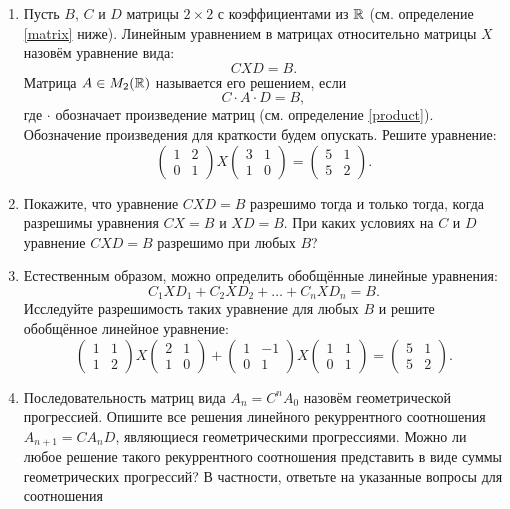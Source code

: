 
\begin{enumerate}
\item Пусть $B$, $C$ и $D$ матрицы $2\times 2$ с коэффициентами из $\mathbb{R}$ (см. определение \ref{matrix} ниже). Линейным уравнением в матрицах относительно матрицы $X$ назовём уравнение вида: 
$$CXD=B.$$
Матрица $A\in M_2(\mathbb{R})$ называется его решением, если 
$$C\cdot A\cdot D=B,$$
где $\cdot$ обозначает произведение матриц (см. определение \ref{product}). Обозначение произведения для краткости будем опускать.
Решите уравнение:
$$\left(\begin{smallmatrix} 1&2\\ 0&1 \end{smallmatrix}\right) X \left(\begin{smallmatrix} 3&1\\ 1&0 \end{smallmatrix}\right) =
\left(\begin{smallmatrix} 5&1\\ 5&2 \end{smallmatrix}\right) .$$
\item Покажите, что уравнение $CXD=B$ разрешимо тогда и только тогда, когда разрешимы уравнения $CX=B$ и $XD=B$. При каких условиях на $C$ и $D$ уравнение $CXD=B$ разрешимо при любых $B$?
\item Естественным образом, можно определить обобщённые линейные уравнения:
$$C_1 X D_1+ C_2 X D_2+\dots+ C_n X D_n=B.$$
Исследуйте разрешимость таких уравнение для любых $B$ и решите обобщённое линейное уравнение:
$$\left(\begin{smallmatrix} 1&1\\ 1&2 \end{smallmatrix}\right) X \left(\begin{smallmatrix} 2&1\\ 1&0 \end{smallmatrix}\right) + \left(\begin{smallmatrix} 1&-1\\ 0&1 \end{smallmatrix}\right) X \left(\begin{smallmatrix} 1&1\\ 0&1 \end{smallmatrix}\right) =
\left(\begin{smallmatrix} 5&1\\ 5&2 \end{smallmatrix}\right).$$
\item Последовательность матриц вида $A_n=C^nA_0$ назовём геометрической прогрессией. Опишите все решения линейного рекуррентного соотношения $A_{n+1}=CA_nD$, являющиеся геометрическими прогрессиями. Можно ли любое решение такого рекуррентного соотношения представить в виде суммы геометрических прогрессий? В частности, ответьте на указанные вопросы для соотношения

\end{enumerate}
